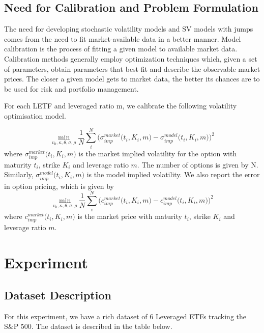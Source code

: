 \documentclass{article}
\begin{document}
\subsection{Need for Calibration and Problem Formulation}
The need for developing stochastic volatility models and SV models with jumps comes from the need to fit market-available data in a better manner. Model calibration is the process of fitting a given model to available market data. Calibration methods generally employ optimization techniques which, given a set of parameters, obtain parameters that best fit and describe the observable market prices. The closer a given model gets to market data, the better its chances are to be used for risk and portfolio management. 
\newline\newline

For each LETF and leveraged ratio m, we calibrate the following volatility optimisation model.

\begin{equation}
    \min_{v_{0},\kappa,\theta,\sigma,\rho}\frac{1}{N}\sum_{i}^{N}\big(\sigma_{imp}^{market}\big(t_{i},K_{i},m\big) - \sigma_{imp}^{model}\big(t_{i},K_{i},m\big)\big)^2
\end{equation}
where $\sigma_{imp}^{market}\big(t_{i},K_{i},m\big)$ is the market implied volatility for the option with maturity $t_i$, strike $K_i$ and leverage ratio $m$. The number of options is given by N. Similarly, $\sigma_{imp}^{model}\big(t_{i},K_{i},m\big)$ is the model implied volatility. We also report the error in option pricing, which is given by
\begin{equation}
    \min_{v_{0},\kappa,\theta,\sigma,\rho}\frac{1}{N}\sum_{i}^{N}\big(c_{imp}^{market}\big(t_{i},K_{i},m\big) - c_{imp}^{model}\big(t_{i},K_{i},m\big)\big)^2
\end{equation}
where $c_{imp}^{market}\big(t_{i},K_{i},m\big)$ is the market price with maturity $t_i$, strike $K_i$ and leverage ratio $m$.

\cleardoublepage
\section{Experiment}
\subsection{Dataset Description}
For this experiment, we have a rich dataset of 6 Leveraged ETFs tracking the S&P 500. The dataset is described in the table below. 
\end{document}
